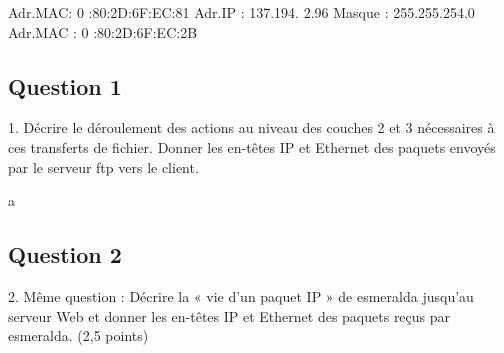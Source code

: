 \documentclass{article}
\begin{document}
Adr.MAC: 0 :80:2D:6F:EC:81
Adr.IP : 137.194. 2.96 Masque : 255.255.254.0
Adr.MAC : 0 :80:2D:6F:EC:2B
\subsection*{Question 1}
\begin{exercise}
    1. Décrire le déroulement des actions au niveau des couches 2 et 3 nécessaires à ces
transferts de fichier. Donner les en-têtes IP et Ethernet des paquets envoyés par le
serveur ftp vers le client.
\end{exercise}
\begin{resolution}
    a
\end{resolution}

\subsection*{Question 2}
\begin{exercise}
    2. Même question : Décrire la « vie d’un paquet IP » de esmeralda jusqu’au serveur
Web et donner les en-têtes IP et Ethernet des paquets reçus par esmeralda. (2,5
points)
\end{exercise}
\begin{resolution}

\end{resolution}
\end{document}

